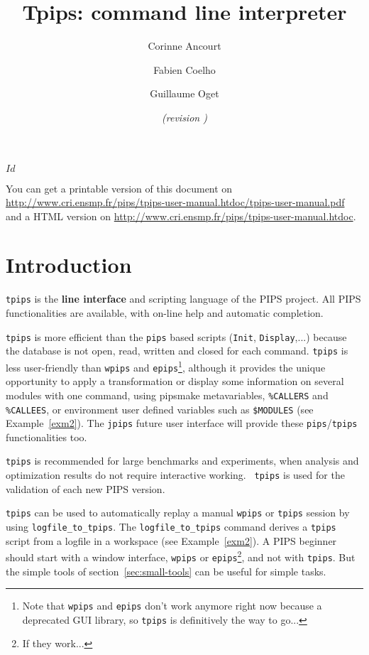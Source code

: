 \documentclass[a4paper]{article}
\title{Tpips: command line interpreter}
\author{Corinne Ancourt \and Fabien Coelho \and Guillaume Oget}
\date{\svnInfoLongDate{} \emph{(revision \svnInfoRevision)}}
\newcommand{\PipsTpipsPDF}{\url{http://www.cri.ensmp.fr/pips/tpips-user-manual.htdoc/tpips-user-manual.pdf}\xspace}
\newcommand{\PipsTpipsHTDOC}{\url{http://www.cri.ensmp.fr/pips/tpips-user-manual.htdoc}\xspace}
\begin{document}
\svnInfo $Id$

\setlength{\parindent}{0in}

\maketitle

You can get a printable version of this document on\\
\PipsTpipsPDF and a HTML version on \PipsTpipsHTDOC.

\tableofcontents

\section{Introduction}


{\tt tpips} is the {\bf line interface} and scripting language of the
PIPS project. All PIPS functionalities are available, with
on-line help and automatic completion.

{\tt tpips} is more efficient than the \texttt{pips} based scripts
(\texttt{Init}, \texttt{Display},...) because the database is not open,
read, written and closed for each command. {\tt tpips} is less
user-friendly than \texttt{wpips} and \texttt{epips}\footnote{Note that
  \texttt{wpips} and \texttt{epips} don't work anymore right now because a
  deprecated GUI library, so \texttt{tpips} is definitively the way to
  go...}, although it provides the unique opportunity to apply a
transformation or display some information on several modules with one
command, using pipsmake metavariables, \verb+%CALLERS+ and
\verb+%CALLEES+,
or environment user defined variables such as \verb+$MODULES+ %
(see Example~\ref{exm2}). The \texttt{jpips} future user interface will
provide these \texttt{pips}/\texttt{tpips} functionalities too.

{\tt tpips} is recommended for large benchmarks and experiments, when
analysis and optimization results do not require interactive working. {\tt
  tpips} is used for the validation of each new PIPS version.

{\tt tpips} can be used to automatically replay a manual \texttt{wpips} or
{\tt tpips} session by using \verb+logfile_to_tpips+. The
\verb+logfile_to_tpips+ command derives a {\tt tpips} script from a
logfile in a workspace (see Example~\ref{exm2}). A PIPS beginner should
start with a window interface, \texttt{wpips} or
\texttt{epips}\footnote{If they work...}, and not with \texttt{tpips}. But
the simple tools of section~\ref{sec:small-tools} can be useful for simple
tasks.
\end{document}

